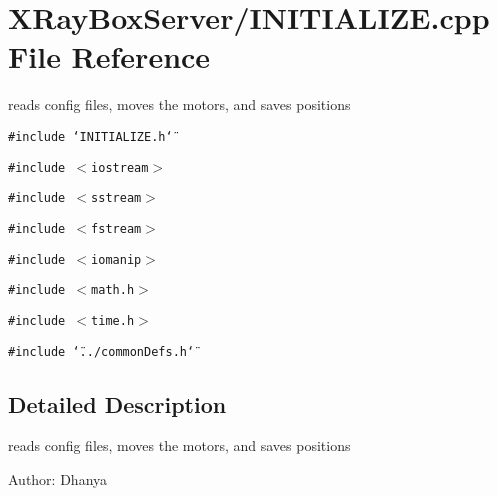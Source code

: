\section{XRay\-Box\-Server/INITIALIZE.cpp File Reference}
\label{INITIALIZE_8cpp}
reads config files, moves the motors, and saves positions 

{\tt \#include \char`\"{}INITIALIZE.h\char`\"{}}\par
{\tt \#include $<$iostream$>$}\par
{\tt \#include $<$sstream$>$}\par
{\tt \#include $<$fstream$>$}\par
{\tt \#include $<$iomanip$>$}\par
{\tt \#include $<$math.h$>$}\par
{\tt \#include $<$time.h$>$}\par
{\tt \#include \char`\"{}../common\-Defs.h\char`\"{}}\par


\subsection{Detailed Description}
reads config files, moves the motors, and saves positions 

\begin{Desc}
\item[Author:]Dhanya \end{Desc}
